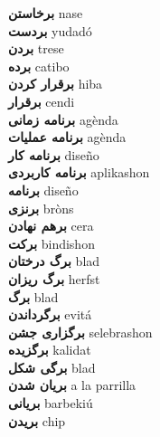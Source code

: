 \textbf{ برخاستن  } nase \\
\textbf{ بردست  } yudadó \\
\textbf{ بردن  } trese \\
\textbf{ برده  } catibo \\
\textbf{ برقرار کردن  } hiba \\
\textbf{ برقرار  } cendi \\
\textbf{ برنامه زمانی  } agènda \\
\textbf{ برنامه عملیات  } agènda \\
\textbf{ برنامه کار  } diseño \\
\textbf{ برنامه کاربردی  } aplikashon \\
\textbf{ برنامه  } diseño \\
\textbf{ برنزی  } bròns \\
\textbf{ برهم نهادن  } cera \\
\textbf{ برکت  } bindishon \\
\textbf{ برگ درختان  } blad \\
\textbf{ برگ ریزان  } herfst \\
\textbf{ برگ  } blad \\
\textbf{ برگرداندن  } evitá \\
\textbf{ برگزاری جشن  } selebrashon \\
\textbf{ برگزیده  } kalidat \\
\textbf{ برگی شکل  } blad \\
\textbf{ بریان شدن  } a la parrilla \\
\textbf{ بریانی  } barbekiú \\
\textbf{ بریدن  } chip \\
